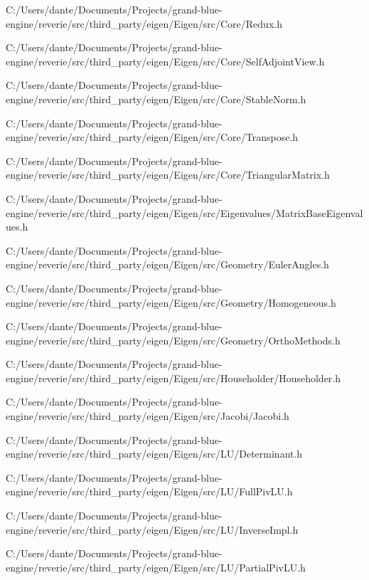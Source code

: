 \begin{DoxyCompactItemize}
C\+:/\+Users/dante/\+Documents/\+Projects/grand-\/blue-\/engine/reverie/src/third\+\_\+party/eigen/\+Eigen/src/\+Core/Redux.\+h\item 
C\+:/\+Users/dante/\+Documents/\+Projects/grand-\/blue-\/engine/reverie/src/third\+\_\+party/eigen/\+Eigen/src/\+Core/Self\+Adjoint\+View.\+h\item 
C\+:/\+Users/dante/\+Documents/\+Projects/grand-\/blue-\/engine/reverie/src/third\+\_\+party/eigen/\+Eigen/src/\+Core/Stable\+Norm.\+h\item 
C\+:/\+Users/dante/\+Documents/\+Projects/grand-\/blue-\/engine/reverie/src/third\+\_\+party/eigen/\+Eigen/src/\+Core/Transpose.\+h\item 
C\+:/\+Users/dante/\+Documents/\+Projects/grand-\/blue-\/engine/reverie/src/third\+\_\+party/eigen/\+Eigen/src/\+Core/Triangular\+Matrix.\+h\item 
C\+:/\+Users/dante/\+Documents/\+Projects/grand-\/blue-\/engine/reverie/src/third\+\_\+party/eigen/\+Eigen/src/\+Eigenvalues/Matrix\+Base\+Eigenvalues.\+h\item 
C\+:/\+Users/dante/\+Documents/\+Projects/grand-\/blue-\/engine/reverie/src/third\+\_\+party/eigen/\+Eigen/src/\+Geometry/Euler\+Angles.\+h\item 
C\+:/\+Users/dante/\+Documents/\+Projects/grand-\/blue-\/engine/reverie/src/third\+\_\+party/eigen/\+Eigen/src/\+Geometry/Homogeneous.\+h\item 
C\+:/\+Users/dante/\+Documents/\+Projects/grand-\/blue-\/engine/reverie/src/third\+\_\+party/eigen/\+Eigen/src/\+Geometry/Ortho\+Methods.\+h\item 
C\+:/\+Users/dante/\+Documents/\+Projects/grand-\/blue-\/engine/reverie/src/third\+\_\+party/eigen/\+Eigen/src/\+Householder/Householder.\+h\item 
C\+:/\+Users/dante/\+Documents/\+Projects/grand-\/blue-\/engine/reverie/src/third\+\_\+party/eigen/\+Eigen/src/\+Jacobi/Jacobi.\+h\item 
C\+:/\+Users/dante/\+Documents/\+Projects/grand-\/blue-\/engine/reverie/src/third\+\_\+party/eigen/\+Eigen/src/\+L\+U/Determinant.\+h\item 
C\+:/\+Users/dante/\+Documents/\+Projects/grand-\/blue-\/engine/reverie/src/third\+\_\+party/eigen/\+Eigen/src/\+L\+U/Full\+Piv\+L\+U.\+h\item 
C\+:/\+Users/dante/\+Documents/\+Projects/grand-\/blue-\/engine/reverie/src/third\+\_\+party/eigen/\+Eigen/src/\+L\+U/Inverse\+Impl.\+h\item 
C\+:/\+Users/dante/\+Documents/\+Projects/grand-\/blue-\/engine/reverie/src/third\+\_\+party/eigen/\+Eigen/src/\+L\+U/Partial\+Piv\+L\+U.\+h\item 

\end{DoxyCompactItemize}
